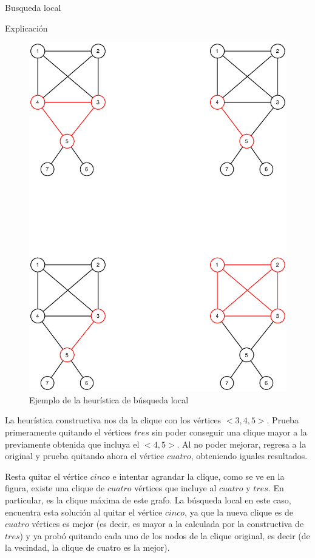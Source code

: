 \begin{section}{Busqueda local}
\begin{subsection}{Explicación}
			\begin{figure}[H]
				\centering
		    	\includegraphics[scale=0.5]{busqueda_local/seguimiento.eps}
			    \caption{Ejemplo de la heurística de búsqueda local}
			    \label{fig:seguimiento_busqueda_local}
			\end{figure}

			La heurística constructiva nos da la clique con los vértices $<3,4,5>$. Prueba primeramente quitando el vértices $tres$ sin poder conseguir una clique mayor a la previamente obtenida que incluya el $<4,5>$. Al no poder mejorar, regresa a la original y prueba quitando ahora el vértice $cuatro$, obteniendo iguales resultados.

			Resta quitar el vértice $cinco$ e intentar agrandar la clique, como se ve en la figura, existe una clique de $cuatro$ vértices que incluye al $cuatro$ y $tres$. En particular, es la clique máxima de este grafo. La búsqueda local en este caso, encuentra esta solución al quitar el vértice $cinco$, ya que la nueva clique es de $cuatro$ vértices es mejor (es decir, es mayor a la calculada por la constructiva de $tres$) y ya probó quitando cada uno de los nodos de la clique original, es decir (de la vecindad, la clique de cuatro es la mejor).


\end{subsection}
\end{section}
